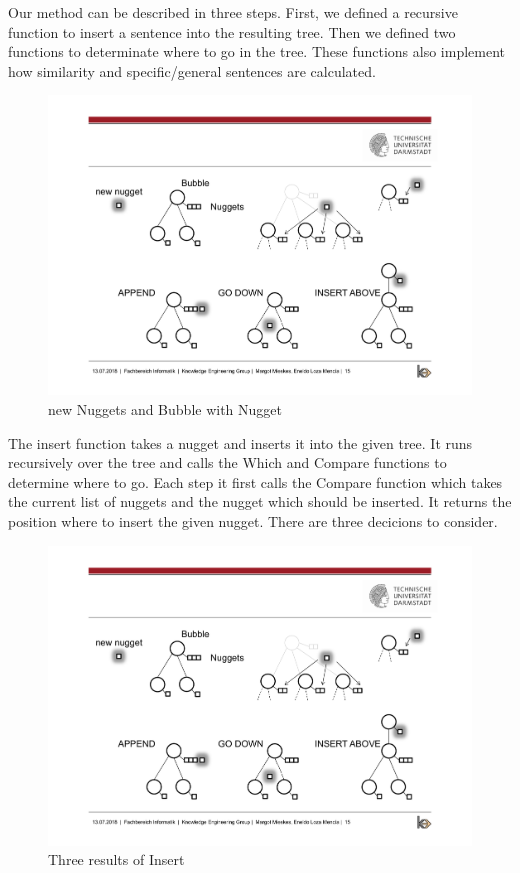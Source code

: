 
Our method can be described in three steps. First, we defined a recursive function to insert a sentence into the resulting tree. Then we defined two functions to determinate where to go in the tree. These functions also implement how similarity and specific/general sentences are calculated.

\begin{figure}[H]
	\centering
	\includegraphics[trim=3cm 10cm 15cm 5.8cm, clip=true]{img/step2_func.pdf}
	\caption{new Nuggets and Bubble with Nugget}
	\label{fig:nuggetbubble}
\end{figure}

The insert function takes a nugget and inserts it into the given tree. It runs recursively over the tree and calls the Which and Compare functions to determine where to go. Each step it first calls the Compare function which takes the current list of nuggets and the nugget which should be inserted. It returns the position where to insert the given nugget. There are three decicions to consider.
\begin{figure}[H]
	\centering
	\includegraphics[trim=3.5cm 3cm 3cm 11cm, clip=true, width= \textwidth]{img/step2_func.pdf}
	\caption{Three results of Insert}
	\label{fig:insert}
\end{figure}

